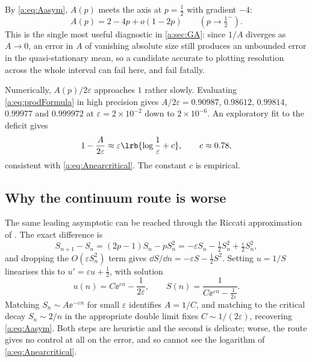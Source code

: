 \begin{remark}
\label{a:rem:gradient}
By \cref{a:eq:Aasym}, $A(p)$ meets the axis at $p=\tfrac12$ with gradient $-4$:
\begin{equation}
\label{a:eq:gradient}
A(p) = 2-4p+o(1-2p)\qquad(p\to\tfrac12^-).
\end{equation}
This is the single most useful diagnostic in \cref{a:sec:GA}: since $1/A$ diverges
as $A\to0$, an error in $A$ of vanishing absolute size still produces an unbounded
error in the quasi-stationary mean, so a candidate accurate to plotting resolution
across the whole interval can fail here, and fail fatally.
\end{remark}

\begin{remark}
\label{a:rem:rate}
Numerically, $A(p)/2\varepsilon$ approaches $1$ rather slowly. Evaluating
\cref{a:eq:prodFormula} in high precision gives $A/2\varepsilon = 0.90987$,
$0.98612$, $0.99814$, $0.99977$ and $0.999972$ at $\varepsilon=2\times10^{-2}$ down
to $2\times10^{-6}$. An exploratory fit to the deficit gives
\begin{equation}
\label{a:eq:empiricalcorrection}
1-\frac{A}{2\varepsilon}\approx\varepsilon\lrb{\log\frac1\varepsilon+c},
\qquad c\approx0.78,
\end{equation}
consistent with \cref{a:eq:Anearcritical}. The constant $c$ is empirical.
\end{remark}

\subsection*{Why the continuum route is worse}

The same leading asymptotic can be reached through the Riccati approximation of
\ChM. The exact difference is
\begin{equation*}
S_{n+1}-S_n = (2p-1)S_n - pS_n^2
= -\varepsilon S_n - \tfrac12S_n^2 + \tfrac{\varepsilon}{2}S_n^2 ,
\end{equation*}
and dropping the $O(\varepsilon S_n^2)$ term gives
$\dd S/\dd n = -\varepsilon S-\tfrac12S^2$. Setting $u=1/S$ linearises this to
$u' = \varepsilon u+\tfrac12$, with solution
\begin{equation*}
u(n) = C\ee^{\varepsilon n} - \frac{1}{2\varepsilon},
\qquad
S(n) = \frac{1}{C\ee^{\varepsilon n}-\frac{1}{2\varepsilon}} .
\end{equation*}
Matching $S_n\sim A\ee^{-\varepsilon n}$ for small $\varepsilon$ identifies
$A=1/C$, and matching to the critical decay $S_n\sim2/n$ in the appropriate double
limit fixes $C\sim1/(2\varepsilon)$, recovering \cref{a:eq:Aasym}. Both steps are
heuristic and the second is delicate; worse, the route gives no control at all on
the error, and so cannot see the logarithm of \cref{a:eq:Anearcritical}.
